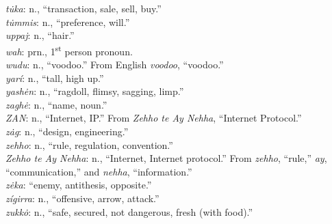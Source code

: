 \documentclass{article}[10pt]
\begin{document}
\begin{multicols}{3}
\emph{t\.{u}ka}: n., ``transaction, sale, sell, buy.''\\
\emph{t\.{u}mmis}: n., ``preference, will.''\\
\emph{uppaj}: n., ``hair.''\\
\emph{wah}: prn., 1\textsuperscript{st} person pronoun.\\
\emph{wudu}: n., ``voodoo.'' From English \emph{voodoo}, ``voodoo.''\\
\emph{yar\'{i}}: n., ``tall, high up.''\\
\emph{yash\.{e}n}: n., ``ragdoll, flimsy, sagging, limp.''\\
\emph{zagh\.{e}}: n., ``name, noun.''\\
\emph{ZAN}: n., ``Internet, IP.'' From \emph{Zehho te Ay Nehha}, ``Internet Protocol.''\\
\emph{z\.{a}g}: n., ``design, engineering.''\\
\emph{zehho}: n., ``rule, regulation, convention.''\\
\emph{Zehho te Ay Nehha}: n., ``Internet, Internet protocol.'' From \emph{zehho}, ``rule,'' \emph{ay}, ``communication,'' and \emph{nehha}, ``information.''\\
\emph{z\.{e}ka}: ``enemy, antithesis, opposite.''\\
\emph{z\'{i}girra}: n., ``offensive, arrow, attack.''\\
\emph{zukk\.{o}}: n., ``safe, secured, not dangerous, fresh (with food).''\\
\end{multicols}
\end{document}
